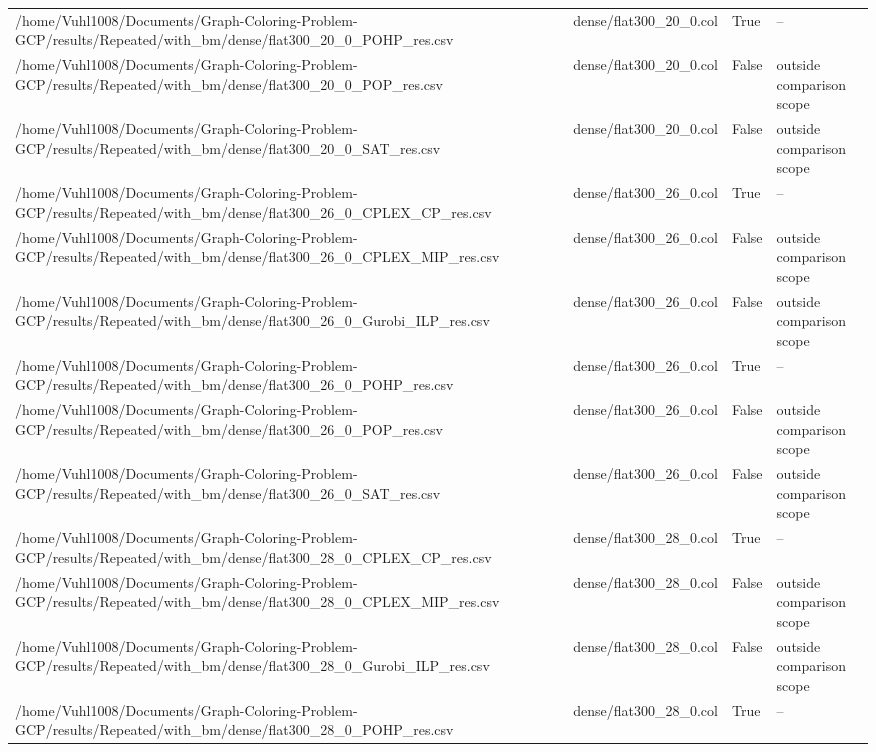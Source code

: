 \begin{table}[htbp]
\begin{tabular}{llll}
/home/Vuhl1008/Documents/Graph-Coloring-Problem-GCP/results/Repeated/with\_bm/dense/flat300\_20\_0\_POHP\_res.csv & dense/flat300\_20\_0.col & True & -- \\
/home/Vuhl1008/Documents/Graph-Coloring-Problem-GCP/results/Repeated/with\_bm/dense/flat300\_20\_0\_POP\_res.csv & dense/flat300\_20\_0.col & False & outside comparison scope \\
/home/Vuhl1008/Documents/Graph-Coloring-Problem-GCP/results/Repeated/with\_bm/dense/flat300\_20\_0\_SAT\_res.csv & dense/flat300\_20\_0.col & False & outside comparison scope \\
/home/Vuhl1008/Documents/Graph-Coloring-Problem-GCP/results/Repeated/with\_bm/dense/flat300\_26\_0\_CPLEX\_CP\_res.csv & dense/flat300\_26\_0.col & True & -- \\
/home/Vuhl1008/Documents/Graph-Coloring-Problem-GCP/results/Repeated/with\_bm/dense/flat300\_26\_0\_CPLEX\_MIP\_res.csv & dense/flat300\_26\_0.col & False & outside comparison scope \\
/home/Vuhl1008/Documents/Graph-Coloring-Problem-GCP/results/Repeated/with\_bm/dense/flat300\_26\_0\_Gurobi\_ILP\_res.csv & dense/flat300\_26\_0.col & False & outside comparison scope \\
/home/Vuhl1008/Documents/Graph-Coloring-Problem-GCP/results/Repeated/with\_bm/dense/flat300\_26\_0\_POHP\_res.csv & dense/flat300\_26\_0.col & True & -- \\
/home/Vuhl1008/Documents/Graph-Coloring-Problem-GCP/results/Repeated/with\_bm/dense/flat300\_26\_0\_POP\_res.csv & dense/flat300\_26\_0.col & False & outside comparison scope \\
/home/Vuhl1008/Documents/Graph-Coloring-Problem-GCP/results/Repeated/with\_bm/dense/flat300\_26\_0\_SAT\_res.csv & dense/flat300\_26\_0.col & False & outside comparison scope \\
/home/Vuhl1008/Documents/Graph-Coloring-Problem-GCP/results/Repeated/with\_bm/dense/flat300\_28\_0\_CPLEX\_CP\_res.csv & dense/flat300\_28\_0.col & True & -- \\
/home/Vuhl1008/Documents/Graph-Coloring-Problem-GCP/results/Repeated/with\_bm/dense/flat300\_28\_0\_CPLEX\_MIP\_res.csv & dense/flat300\_28\_0.col & False & outside comparison scope \\
/home/Vuhl1008/Documents/Graph-Coloring-Problem-GCP/results/Repeated/with\_bm/dense/flat300\_28\_0\_Gurobi\_ILP\_res.csv & dense/flat300\_28\_0.col & False & outside comparison scope \\
/home/Vuhl1008/Documents/Graph-Coloring-Problem-GCP/results/Repeated/with\_bm/dense/flat300\_28\_0\_POHP\_res.csv & dense/flat300\_28\_0.col & True & -- \\

\end{tabular}
\end{table}
